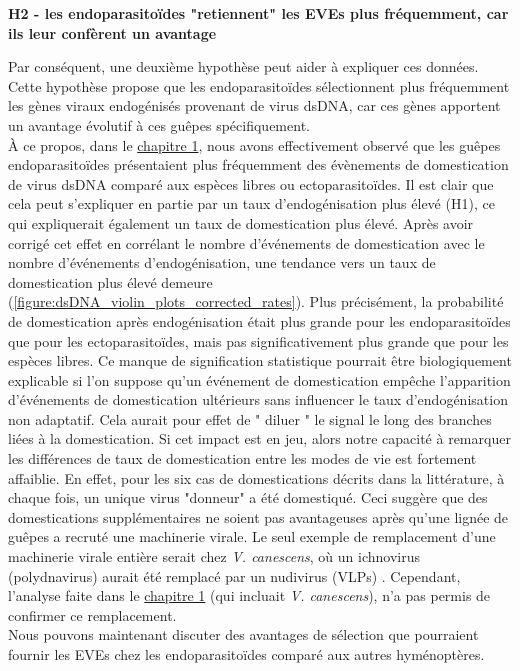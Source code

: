 \textbf{H2 - les endoparasitoïdes "retiennent" les EVEs plus fréquemment, car ils leur confèrent un avantage}

Par conséquent, une deuxième hypothèse peut aider à expliquer ces données. Cette hypothèse propose que les endoparasitoïdes sélectionnent plus fréquemment les gènes viraux endogénisés provenant de virus dsDNA, car ces gènes apportent un avantage évolutif à ces guêpes spécifiquement.\\

À ce propos, dans le \hyperref[sec:chap1]{chapitre 1}, nous avons effectivement observé que les guêpes endoparasitoïdes présentaient plus fréquemment des évènements de domestication de virus dsDNA comparé aux espèces libres ou ectoparasitoïdes. Il est clair que cela peut s'expliquer en partie par un taux d'endogénisation plus élevé (H1), ce qui expliquerait également un taux de domestication plus élevé. Après avoir corrigé cet effet en corrélant le nombre d'événements de domestication avec le nombre d'événements d'endogénisation, une tendance vers un taux de domestication plus élevé demeure (\figurename{\ref{figure:dsDNA_violin_plots_corrected_rates}}). Plus précisément, la probabilité de domestication après endogénisation était plus grande pour les endoparasitoïdes que pour les ectoparasitoïdes, mais pas significativement plus grande que pour les espèces libres. Ce manque de signification statistique pourrait être biologiquement explicable si l'on suppose qu'un événement de domestication empêche l'apparition d'événements de domestication ultérieurs sans influencer le taux d'endogénisation non adaptatif. Cela aurait pour effet de " diluer " le signal le long des branches liées à la domestication. Si cet impact est en jeu, alors notre capacité à remarquer les différences de taux de domestication entre les modes de vie est fortement affaiblie.  En effet, pour les six cas de domestications décrits dans la littérature, à chaque fois, un unique virus "donneur" a été domestiqué. Ceci suggère que des domestications supplémentaires ne soient pas avantageuses après qu'une lignée de guêpes a recruté une machinerie virale. Le seul exemple de remplacement d'une machinerie virale entière serait chez \textit{V. canescens}, où un ichnovirus (polydnavirus) aurait été remplacé par un nudivirus (VLPs) \citep{pichon_recurrent_2015}. Cependant, l'analyse faite dans le \hyperref[sec:chap1]{chapitre 1} (qui incluait \textit{V. canescens}), n'a pas permis de confirmer ce remplacement.\\

Nous pouvons maintenant discuter des avantages de sélection que pourraient fournir les EVEs chez les endoparasitoïdes comparé aux autres hyménoptères.\\ 

